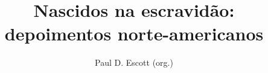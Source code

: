 \documentclass[11pt]{extarticle}
\begin{document}
\newcommand{\AutorLivro}{Paul D. Escott (org.)}
\newcommand{\TituloLivro}{Nascidos na escravidão: depoimentos norte-americanos}
\newcommand{\Tema}{Diálogos com a sociologia e com a antropologia}
\newcommand{\Genero}{Relatos e memórias}
\newcommand{\imagemCapa}{./images/PNLD0007-01.png}
\newcommand{\issnppub}{---}
\newcommand{\issnepub}{---}
\newcommand{\colaborador}{\textbf{Eduardo Modesto de Carvalho, Bruno Gradella e Vicente Castro} é uma pessoa incrível e vai fazer um bom serviço.}


\title{\TituloLivro}
\author{\AutorLivro}
\def\authornotes{\colaborador}

\date{}
\maketitle
\end{document}

